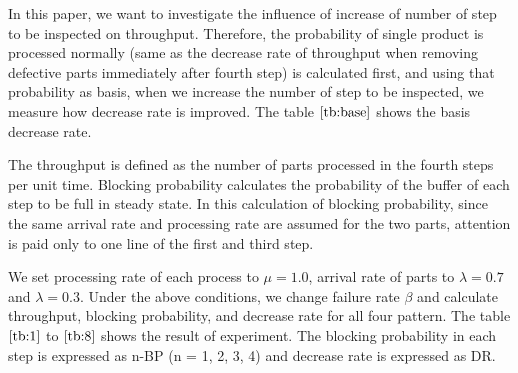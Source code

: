 In this paper, we want to investigate the influence of increase of number of step to be inspected on throughput.
Therefore, the probability of single product is processed normally (same as the decrease rate of throughput when removing defective parts immediately after fourth step) is calculated first, and using that probability as basis, when we increase the number of step to be inspected, we measure how decrease rate is improved.
The table $\ref{tb:base}$ shows the basis decrease rate.

The throughput is defined as the number of parts processed in the fourth steps per unit time.
Blocking probability calculates the probability of the buffer of each step to be full in steady state.
In this calculation of blocking probability, since the same arrival rate and processing rate are assumed for the two parts, attention is paid only to one line of the first and third step. 

We set processing rate of each process to $\mu=1.0$, arrival rate of parts to $\lambda =0.7$ and $\lambda = 0.3$.
Under the above conditions, we change failure rate $\beta$ and calculate throughput, blocking probability, and decrease rate for all four pattern.
The table $\ref{tb:1}$ to $\ref{tb:8}$ shows the result of experiment.
The blocking probability in each step is expressed as n-BP (n = 1, 2, 3, 4) and decrease rate is expressed as DR.

\begin{table}[ht]
	\centering
	\caption{Probability that parts leaving the system is defective}
	\label{tb:base}
\end{table}





